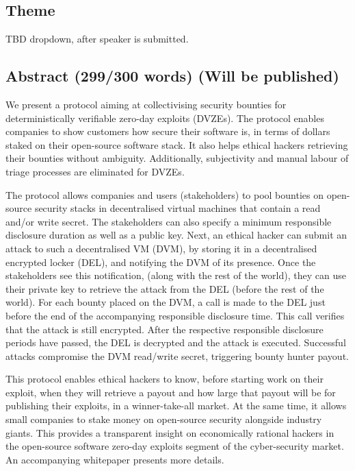 \documentclass{article}
\begin{document}
\subsection*{Theme}
TBD dropdown, after speaker is submitted.
\subsection{Abstract (299/300 words) (Will be published)}
We present a protocol aiming at collectivising security bounties for deterministically verifiable zero-day exploits (DVZEs). The protocol enables companies to show customers how secure their software is, in terms of dollars staked on their open-source software stack. It also helps ethical hackers retrieving their bounties without ambiguity. Additionally, subjectivity and manual labour of triage processes are eliminated for DVZEs.

The protocol allows companies and users (stakeholders) to pool bounties on open-source security stacks in decentralised virtual machines that contain a read and/or write secret. The stakeholders can also specify a minimum responsible disclosure duration as well as a public key. Next, an ethical hacker can submit an attack to such a decentralised VM (DVM), by storing it in a decentralised encrypted locker (DEL), and notifying the DVM of its presence. Once the stakeholders see this notification, (along with the rest of the world), they can use their private key to retrieve the attack from the DEL (before the rest of the world). For each bounty placed on the DVM, a call is made to the DEL just before the end of the accompanying responsible disclosure time. This call verifies that the attack is still encrypted. After the respective responsible disclosure periods have passed, the DEL is decrypted and the attack is executed. Successful attacks compromise the DVM read/write secret, triggering bounty hunter payout.

This protocol enables ethical hackers to know, before starting work on their exploit, when they will retrieve a payout and how large that payout will be for publishing their exploits, in a winner-take-all market. At the same time, it allows small companies to stake money on open-source security alongside industry giants. This provides a transparent insight on economically rational hackers in the open-source software zero-day exploits segment of the cyber-security market. An accompanying whitepaper presents more details.

\end{document}
